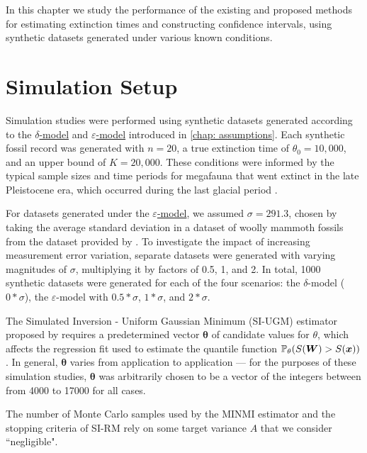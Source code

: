 
In this chapter we study the performance of the existing and proposed methods for estimating extinction times and constructing confidence intervals, using synthetic datasets generated under various known conditions.

\section{Simulation Setup}

Simulation studies were performed using synthetic datasets generated according to the \hyperref[model: no-measurement-error]{$\delta$-model} and \hyperref[model: measurement-error]{$\varepsilon$-model} introduced in \autoref{chap: assumptions}. Each synthetic fossil record was generated with $n=20$, a true extinction time of $\theta_0 = 10,000$, and an upper bound of $K = 20,000$. These conditions were informed by the typical sample sizes and time periods for megafauna that went extinct in the late Pleistocene era, which occurred during the last glacial period \cite{Cooper2015}.

For datasets generated under the \hyperref[model: measurement-error]{$\varepsilon$-model}, we assumed $\sigma = 291.3$, chosen by taking the average standard deviation in a dataset of woolly mammoth fossils from the dataset provided by \citet{Cooper2015}. To investigate the impact of increasing measurement error variation, separate datasets were generated with varying magnitudes of $\sigma$, multiplying it by factors of 0.5, 1, and 2. In total, 1000 synthetic datasets were generated for each of the four scenarios: the $\delta$-model ($0*\sigma$), the $\varepsilon$-model with $0.5*\sigma$, $1*\sigma$, and $2*\sigma$. 

The Simulated Inversion - Uniform Gaussian Minimum (SI-UGM) estimator proposed by \citet{Huang2019} requires a predetermined vector $\bm{\theta}$ of candidate values for $\theta$, which affects the regression fit used to estimate the quantile function $\mathbb{P}_\theta(S(\bm{W}) > S(\bm{x}))$. In general, $\bm{\theta}$ varies from application to application --- for the purposes of these simulation studies, $\bm{\theta}$ was arbitrarily chosen to be a vector of the integers between from 4000 to 17000 for all cases.

The number of Monte Carlo samples used by the MINMI estimator and the stopping criteria of SI-RM rely on some target variance $A$ that we consider ``negligible".

